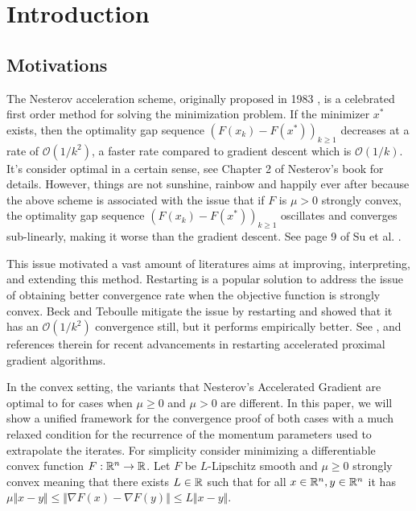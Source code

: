 \documentclass[12pt]{article}
\begin{document}
\section{Introduction}
    \subsection{Motivations}
        The Nesterov acceleration scheme, originally proposed in 1983 \cite{nesterov_method_1983}, is a celebrated first order method for solving the minimization problem.
        If the minimizer $x^*$ exists, then the optimality gap sequence $(F(x_k) - F(x^*))_{k\geq 1}$ decreases at a rate of $\mathcal O(1/k^2)$, a faster rate compared to gradient descent which is $\mathcal O(1/k)$.
        It's consider optimal in a certain sense, see Chapter 2 of Nesterov's book \cite{nesterov_lectures_2018} for details.
        However, things are not sunshine, rainbow and happily ever after because the above scheme is associated with the issue that if $F$ is $\mu > 0$ strongly convex, the optimality gap sequence $(F(x_k) - F(x^*))_{k\geq 1}$ oscillates and converges sub-linearly, making it worse than the gradient descent. See page 9 of Su et al. \cite{su_differential_2016}.
        \par
        This issue motivated a vast amount of literatures aims at improving, interpreting, and extending this method.
        Restarting is a popular solution to address the issue of obtaining better convergence rate when the objective function is strongly convex.
        Beck and Teboulle \cite{beck_fast_2009} mitigate the issue by restarting and showed that it has an $\mathcal O(1/k^2)$ convergence still, but it performs empirically better.
        See \cite{aujol_parameter-free_2024}, \cite{necoara_linear_2019} and references therein for recent advancements in restarting accelerated proximal gradient algorithms.
        \par
        In the convex setting, the variants that Nesterov's Accelerated Gradient are optimal to for cases when $\mu \ge 0$ and $\mu > 0$ are different.
        In this paper, we will show a unified framework for the convergence proof of both cases with a much relaxed condition for the recurrence of the momentum parameters used to extrapolate the iterates.
        For simplicity consider minimizing a differentiable convex function $F: \mathbb R^n \rightarrow \mathbb R$.
        Let $F$ be $L$-Lipschitz smooth and $\mu \ge 0$ strongly convex meaning that there exists $L \in \mathbb R$ such that for all $x \in \mathbb R^n, y\in \mathbb R^n$ it has $\mu\Vert x - y\Vert\le \Vert \nabla F(x) - \nabla F(y)\Vert \le L \Vert x - y \Vert$.
\end{document}

